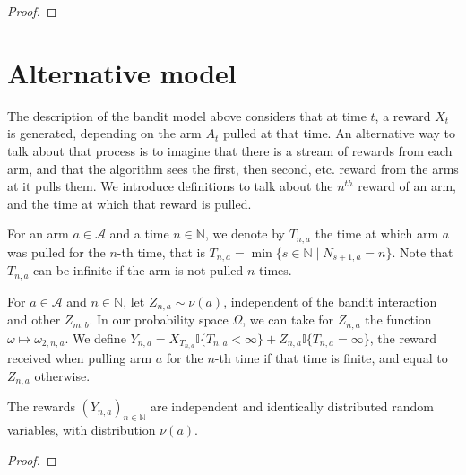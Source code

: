 \begin{proof}

\end{proof}



\section{Alternative model}\label{sec:alt_model}

The description of the bandit model above considers that at time $t$, a reward $X_t$ is generated, depending on the arm $A_t$ pulled at that time.
An alternative way to talk about that process is to imagine that there is a stream of rewards from each arm, and that the algorithm sees the first, then second, etc. reward from the arms at it pulls them.
We introduce definitions to talk about the $n^{th}$ reward of an arm, and the time at which that reward is pulled.

\begin{definition}\label{def:stepsUntil}
  \leanok
For an arm $a \in \mathcal{A}$ and a time $n \in \mathbb{N}$, we denote by $T_{n,a}$ the time at which arm $a$ was pulled for the $n$-th time, that is $T_{n,a} = \min\{s \in \mathbb{N} \mid N_{s+1,a} = n\}$.
Note that $T_{n, a}$ can be infinite if the arm is not pulled $n$ times.
\end{definition}


\begin{definition}\label{def:rewardByCount}
  \leanok
For $a \in \mathcal{A}$ and $n \in \mathbb{N}$, let $Z_{n,a} \sim \nu(a)$, independent of the bandit interaction and other $Z_{m,b}$.
In our probability space $\Omega$, we can take for $Z_{n,a}$ the function $\omega \mapsto \omega_{2,n,a}$.
We define $Y_{n, a} = X_{T_{n,a}} \mathbb{I}\{T_{n, a} < \infty\} + Z_{n,a} \mathbb{I}\{T_{n, a} = \infty\}$, the reward received when pulling arm $a$ for the $n$-th time if that time is finite, and equal to $Z_{n,a}$ otherwise.
\end{definition}


\begin{lemma}\label{lem:iid_rewardByCount}
The rewards $(Y_{n,a})_{n \in \mathbb{N}}$ are independent and identically distributed random variables, with distribution $\nu(a)$.
\end{lemma}

\begin{proof}

\end{proof}


